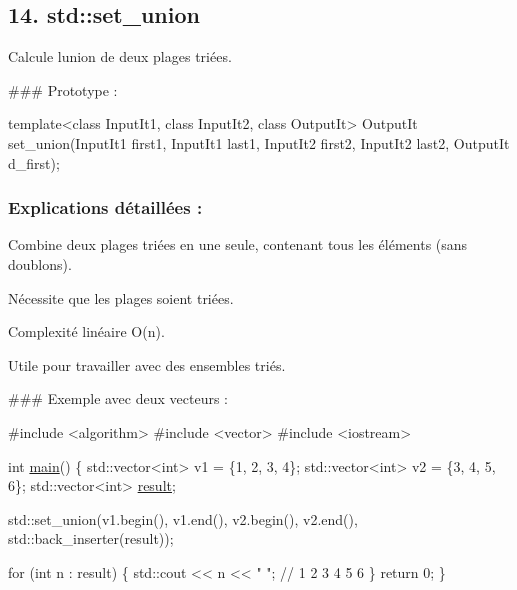 \subsection*{14. {\bfseries std\+::set\+\_\+union}}

Calcule l\textquotesingle{}union de deux plages triées.

\#\#\# Prototype \+: 
\begin{DoxyCode}
\textcolor{keyword}{template}<\textcolor{keyword}{class} InputIt1, \textcolor{keyword}{class} InputIt2, \textcolor{keyword}{class} OutputIt>
OutputIt set\_union(InputIt1 first1, InputIt1 last1,
                   InputIt2 first2, InputIt2 last2,
                   OutputIt d\_first);
\end{DoxyCode}


\subsubsection*{Explications détaillées \+:}


\begin{DoxyItemize}
\item Combine deux plages triées en une seule, contenant tous les éléments (sans doublons).
\item Nécessite que les plages soient triées.
\item Complexité linéaire O(n).
\item Utile pour travailler avec des ensembles triés.
\end{DoxyItemize}

\#\#\# Exemple avec deux vecteurs \+: 
\begin{DoxyCode}
\textcolor{preprocessor}{#include <algorithm>}
\textcolor{preprocessor}{#include <vector>}
\textcolor{preprocessor}{#include <iostream>}

\textcolor{keywordtype}{int} \hyperlink{htop_8c_a3c04138a5bfe5d72780bb7e82a18e627}{main}() \{
    std::vector<int> v1 = \{1, 2, 3, 4\};
    std::vector<int> v2 = \{3, 4, 5, 6\};
    std::vector<int> \hyperlink{namespaceconnexion__SSH_ab06475dbad7f16b89c9114749bc95254}{result};

    std::set\_union(v1.begin(), v1.end(), v2.begin(), v2.end(),
                   std::back\_inserter(result));

    \textcolor{keywordflow}{for} (\textcolor{keywordtype}{int} n : result) \{
        std::cout << n << \textcolor{stringliteral}{" "}; \textcolor{comment}{// 1 2 3 4 5 6}
    \}
    \textcolor{keywordflow}{return} 0;
\}
\end{DoxyCode}
 




